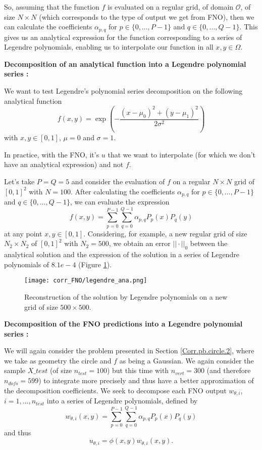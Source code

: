 So, assuming that the function $f$ is evaluated on a regular grid, of domain $\mathcal{O}$, of size $N\times N$ (which corresponds to the type of output we get from FNO), then we can calculate the coefficients $\alpha_{p,q}$ for $p\in\{0,\dots,P-1\}$ and $q\in\{0,\dots,Q-1\}$. This gives us an analytical expression for the function corresponding to a series of Legendre polynomials, enabling us to interpolate our function in all $x,y\in\Omega$.

\textbf{Decomposition of an analytical function into a Legendre polynomial series :}

We want to test Legendre's polynomial series decomposition on the following analytical function
\begin{equation*}
	f(x,y)=\exp\left(-\frac{(x-\mu_0)^2 + (y-\mu_1)^2}{2\sigma^2}\right)
\end{equation*}
with $x,y\in [0,1]$, $\mu=0$ and $\sigma=1$.

\begin{Rem}
	In practice, with the FNO, it's $u$ that we want to interpolate (for which we don't have an analytical expression) and not $f$.
\end{Rem}

Let's take $P=Q=5$ and consider the evaluation of $f$ on a regular $N\times N$ grid of $[0,1]^2$ with $N=100$. After calculating the coefficients $\alpha_{p,q}$ for $p\in \{0,\dots,P-1\}$ and $q\in \{0,\dots,Q-1\}$, we can evaluate the expression
\begin{equation*}
	f(x,y)=\sum_{p=0}^{P-1}\sum_{q=0}^{Q-1}\alpha_{p,q}P_p(x)P_q(y)
\end{equation*}
at any point $x,y\in[0,1]$. Considering, for example, a new regular grid of size $N_2\times N_2$ of $[0,1]^2$ with $N_2=500$, we obtain an error $||\cdot||_0$ between the analytical solution and the expression of the solution in a series of Legendre polynomials of $8.1e-4$ (Figure \ref{legendre_ana}).

\begin{figure}[H]
	\centering
	\texttt{[image: corr\_FNO/legendre\_ana.png]}
	\caption{Reconstruction of the solution by Legendre polynomials on a new grid of size $500\times 500$.}
	\label{legendre_ana}
\end{figure} 

\textbf{Decomposition of the FNO predictions into a Legendre polynomial series :}

We will again consider the problem presented in Section \ref{Corr.pb.circle.2}, where we take as geometry the circle and $f$ as being a Gaussian. We again consider the sample $X\_test$ (of size $n_{test}=100$) but this time with $n_{vert}=300$ (and therefore $n_{dofs}=599$) to integrate more precisely and thus have a better approximation of the decomposition coefficients. We seek to decompose each FNO output $w_{\theta,i}$, $i=1,\dots,n_{test}$ into a series of Legendre polynomials, defined by
\begin{equation*}
	w_{\theta,i}(x,y)=\sum_{p=0}^{P-1}\sum_{q=0}^{Q-1}\alpha_{p,q}P_p(x)P_q(y)
\end{equation*}
and thus
\begin{equation*}
	u_{\theta,i}=\phi(x,y)w_{\theta,i}(x,y).
\end{equation*}

